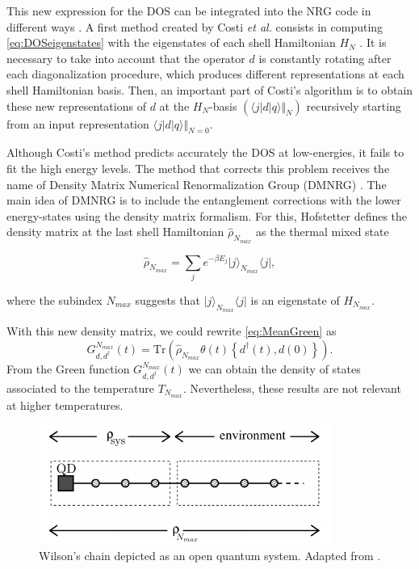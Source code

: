 \noindent This new expression for the DOS can be integrated into  the NRG code in different ways . A first method created by Costi \textit{et al.} consists in computing \eqref{eq:DOSeigenstates} with the eigenstates of each shell Hamiltonian $H_N$  \cite{costi_transport_1994}. It is necessary to take into account that the operator $ d$ is constantly rotating after each diagonalization procedure, which produces different representations at each shell Hamiltonian basis. Then, an important part of Costi's algorithm is to obtain these new representations of $d$ at the $H_N$-basis $(\langle j\vert d\vert q\rangle\Vert_N)$ recursively starting from an input representation $\langle j\vert d\vert q\rangle\Vert_{N=0}$.

Although Costi's method predicts accurately the DOS at low-energies, it fails to fit the high energy levels. The method that corrects this problem receives the name of Density Matrix Numerical Renormalization Group (DMNRG) \cite{hofstetter_generalized_2000}. The main idea of DMNRG is to include the entanglement corrections with the lower energy-states using the density matrix formalism. For this, Hofstetter defines the density matrix at the last shell Hamiltonian $\hat{\rho}_{N_{max}}$ as the thermal mixed state 

\begin{equation}
\hat{\rho}_{N_{max}} = \sum_{j}e^{-\beta E_{j}}\vert j          \rangle_{N_{max}} \langle j\vert, \label{eq:rho_n}
\end{equation}

\noindent where the subindex $N_{max}$ suggests that $\vert j \rangle_{N_{max}} \langle j\vert$ is an eigenstate of $H_{N_{max}}$. 

With this new density matrix, we could rewrite \eqref{eq:MeanGreen} as 
\begin{equation}
G_{d,d^{\dagger}}^{N_{max}}(t) = \text{Tr} \left( \hat{\rho}_{N_{max}}\theta(t)\left\{ d^{\dagger}(t),d(0)\right\} \right). 
\end{equation}
\noindent From the Green function $G_{d,d^{\dagger}}^{N_{max}}(t)$ we can obtain the density of states associated to the temperature $T_{N_{max}}$. Nevertheless, these results are not relevant at higher temperatures. 

\begin{figure}
\centering
\includegraphics[scale=1]{IMAGES/DQD/DMRGchain.png}
\caption{\label{fig:OpenQuantum} Wilson's chain depicted as an open quantum system. Adapted from \cite{hofstetter_generalized_2000}.  }
\end{figure}

